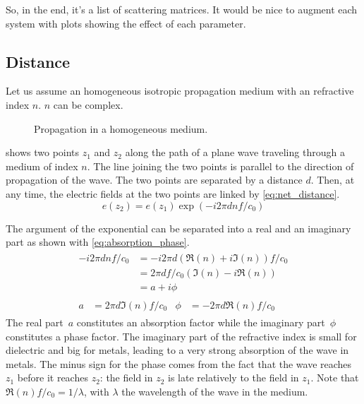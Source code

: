 So, in the end, it's a list of scattering matrices.  It would be nice to augment each system with plots showing the effect of each parameter.




\subsection{Distance}
Let us assume an homogeneous isotropic propagation medium with an refractive index $n$.
$n$ can be complex.

\begin{figure}[hbtp]
    \centering
    \caption{\label{fig:net_distance} Propagation in a homogeneous medium.}
\end{figure}
 shows two points $z_1$ and $z_2$ along the path of a plane wave traveling through a medium of index $n$.
The line joining the two points is parallel to the direction of propagation of the wave.
The two points are separated by a distance $d$.
Then, at any time, the electric fields at the two points are linked by \cref{eq:net_distance}.
\begin{equation}
    e(z_2) = e(z_1) \exp
    \left(
        - i 2\pi d n f / c_0
    \right)
    \label{eq:net_distance}
\end{equation}

The argument of the exponential can be separated into a real and an imaginary part as shown with \cref{eq:absorption_phase}.
\begin{gather}
    \begin{aligned}
        - i 2\pi d n f / c_0
        &= - i 2\pi d \left(\Re(n) + i\Im(n)\right) f / c_0 \\
        &= 2\pi d f / c_0 \left(\Im(n) - i\Re(n) \right) \\
        &= a + i \phi
    \end{aligned}
    \label{eq:absorption_phase}
    \\
    \begin{aligned}
        a &= 2\pi d \Im(n) f / c_0   &   \phi &= -2\pi d \Re(n) f / c_0
    \end{aligned}
\end{gather}
The real part~$a$ constitutes an absorption factor while the imaginary part~$\phi$ constitutes a phase factor.
The imaginary part of the refractive index is small for dielectric and big for metals,
leading to a very strong absorption of the wave in metals.
The minus sign for the phase comes from the fact that the wave reaches $z_1$ before it reaches $z_2$: the field in $z_2$ is late relatively to the field in $z_1$.
Note that $\Re(n) f / c_0 = 1 / \lambda$, with $\lambda$ the wavelength of the wave in the medium.

